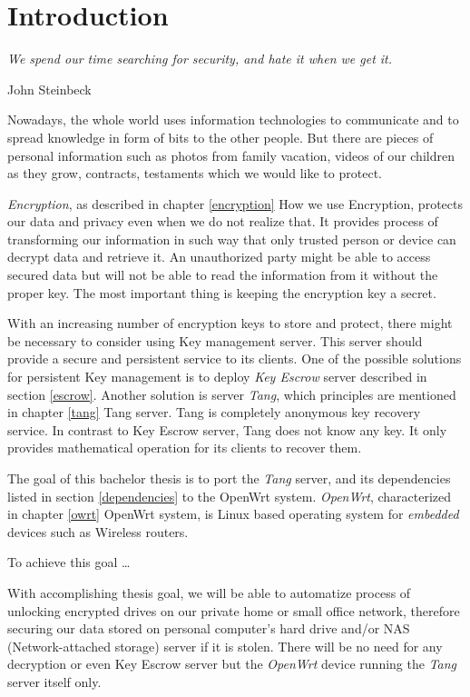 \chapter{Introduction}\label{introduction}
\epigraph{\it We spend our time searching for security, and hate it when we get it.}{{John Steinbeck}\cite{quote}}

Nowadays, the whole world uses information technologies to communicate and to spread knowledge in form of bits to the other people.
But there are pieces of personal information such as photos from family vacation, videos of our children as they grow, contracts, testaments which we would like to protect.

{\it Encryption}, as described in chapter \ref{encryption} How we use Encryption, protects our data and privacy even when we do not realize that.
It provides process of transforming our information in such way that only trusted person or device can decrypt data and retrieve it.
An unauthorized party might be able to access secured data but will not be able to read the information from it without the proper key.
The most important thing is keeping the encryption key a secret.

With an increasing number of encryption keys to store and protect, there might be necessary to consider using Key management server.
This server should provide a secure and persistent service to its clients.
One of the possible solutions for persistent Key management is to deploy {\it Key Escrow} server described in section \ref{escrow}.
Another solution is server {\it Tang}, which principles are mentioned in chapter \ref{tang} Tang server.
Tang is completely anonymous key recovery service.
In contrast to Key Escrow server, Tang does not know any key.
It only provides mathematical operation for its clients to recover them.

The goal of this bachelor thesis is to port the {\it Tang} server, and its dependencies listed in section \ref{dependencies} to the OpenWrt system.
{\it OpenWrt}, characterized in chapter \ref{owrt} OpenWrt system, is Linux based operating system for {\it embedded} devices such as Wireless routers.

To achieve this goal \dots {}

With accomplishing thesis goal, we will be able to automatize process of unlocking encrypted drives on our private home or small office network, therefore securing our data stored on personal computer's hard drive and/or NAS (Network-attached storage) server if it is stolen.
There will be no need for any decryption or even Key Escrow server but the {\it OpenWrt} device running the {\it Tang} server itself only.

